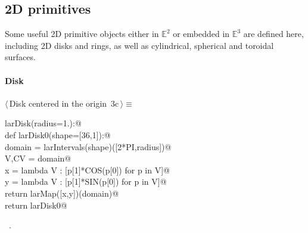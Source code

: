 \documentclass[11pt,oneside]{article}	%
\def\E{\mathbb{E}}
\begin{document}
\subsection{2D primitives}
Some useful 2D primitive objects either in $\E^2$ or embedded in $\E^3$ are defined here, including 2D disks and rings, as well as cylindrical, spherical and toroidal surfaces.

\paragraph{Disk}
\begin{flushleft} \small \label{scrap6}
\protect{}$\langle\,$Disk centered in the origin\nobreak\ {\footnotesize 3c}$\,\rangle\equiv$
\vspace{-1ex}
\begin{list}{}{} \item
\mbox{}\verb@def larDisk(radius=1.):@\\
\mbox{}\verb@   def larDisk0(shape=[36,1]):@\\
\mbox{}\verb@      domain = larIntervals(shape)([2*PI,radius])@\\
\mbox{}\verb@      V,CV = domain@\\
\mbox{}\verb@      x = lambda V : [p[1]*COS(p[0]) for p in V]@\\
\mbox{}\verb@      y = lambda V : [p[1]*SIN(p[0]) for p in V]@\\
\mbox{}\verb@      return larMap([x,y])(domain)@\\
\mbox{}\verb@   return larDisk0@\\
\mbox{}\verb@@{\NWsep}
\end{list}
\vspace{-1ex}
\footnotesize\addtolength{\baselineskip}{-1ex}
\begin{list}{}{\setlength{\itemsep}{-\parsep}\setlength{\itemindent}{-\leftmargin}}
\item \NWtxtMacroRefIn\ .
\end{list}
\end{flushleft}
\end{document}
